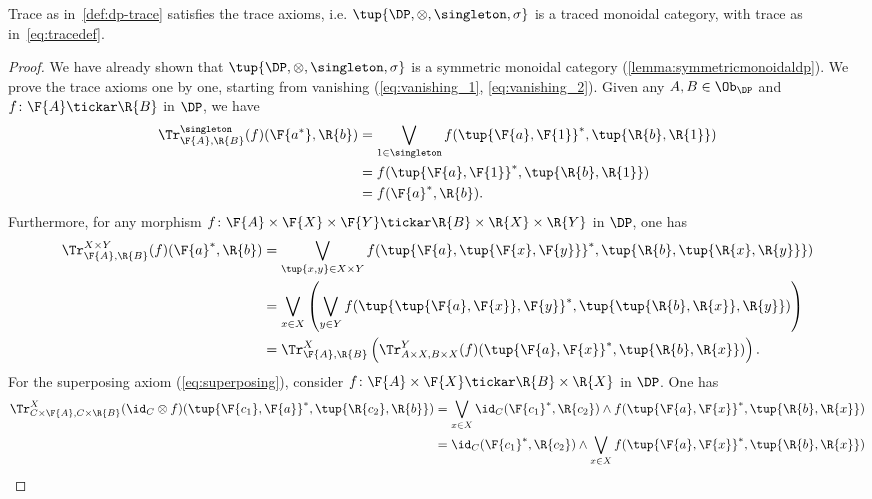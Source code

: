 \begin{lemma}
Trace as in~\cref{def:dp-trace} satisfies the trace axioms, i.e. $\tup{\DP, \otimes, \singleton, \sigma}$ is a traced monoidal category, with trace as in~\cref{eq:tracedef}.
\end{lemma}
\begin{proof}
We have already shown that $\tup{\DP,\otimes,\singleton,\sigma}$ is a symmetric monoidal category (\cref{lemma:symmetricmonoidaldp}).
We prove the trace axioms one by one, starting from vanishing (\cref{eq:vanishing_1}, \cref{eq:vanishing_2}). Given any $A,B\in \Ob_\DP$ and $f\colon \F{A}\tickar \R{B}$ in $\DP$, we have
\begin{equation}
    \begin{aligned}
        \Tr_{\F{A},\R{B}}^{\singleton}(f)(\F{a^*},\R{b})&=\bigvee_{1\in \singleton}f(\tup{\F{a},\F{1}}^*,\tup{\R{b},\R{1}})\\
        &=f(\tup{\F{a},\F{1}}^*,\tup{\R{b},\R{1}})\\
        &=f(\F{a}^*,\R{b}).
    \end{aligned}
\end{equation}
Furthermore, for any morphism $f\colon \F{A}\times \F{X}\times \F{Y} \tickar \R{B}\times \R{X} \times \R{Y}$ in $\DP$, one has
\begin{equation}
    \begin{aligned}
        \Tr_{\F{A},\R{B}}^{X\times Y}(f)(\F{a}^*,\R{b})&=\bigvee_{\tup{x,y} \in X\times Y} f(\tup{\F{a},\tup{\F{x},\F{y}}}^*,\tup{\R{b},\tup{\R{x},\R{y}}})\\
        &=\bigvee_{x \in X}\left(\bigvee_{y \in Y} f(\tup{\tup{\F{a},\F{x}},\F{y}}^*,\tup{\tup{\R{b},\R{x}},\R{y}})\right)\\
        &=\Tr_{\F{A},\R{B}}^X\left(
        \Tr_{A\times X,B\times X}^Y(f)(\tup{\F{a},\F{x}}^*,\tup{\R{b},\R{x}})\right).
    \end{aligned}
\end{equation}
For the superposing axiom (\cref{eq:superposing}), consider $f\colon \F{A}\times \F{X}\tickar \R{B}\times \R{X}$ in $\DP$. One has
\begin{equation}
    \begin{aligned}
        \Tr_{C\times \F{A},C\times \R{B}}^{X}(\id_C\otimes f)(\tup{\F{c_1},\F{a}}^*,\tup{\R{c_2},\R{b}})&=\bigvee_{x\in X} \id_C(\F{c_1}^*,\R{c_2})\wedge f(\tup{\F{a},\F{x}}^*,\tup{\R{b},\R{x}})\\
        &=\id_C(\F{c_1}^*,\R{c_2}) \wedge \bigvee_{x\in X} f(\tup{\F{a},\F{x}}^*,\tup{\R{b},\R{x}})\\

\end{aligned}
\end{equation}
\end{proof}
